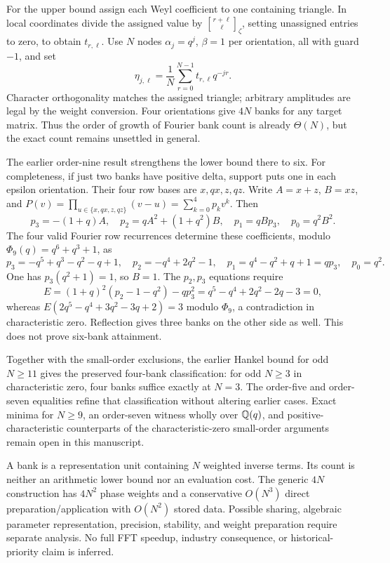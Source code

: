 \documentclass[11pt,letterpaper]{article}
\theoremstyle{definition}\newtheorem{definition}[theorem]{Definition}
\newcommand{\gb}[3]{\genfrac{[}{]}{0pt}{}{#1}{#2}_{#3}}
\begin{document}
For the upper bound assign each Weyl coefficient to one containing triangle. In local coordinates divide the assigned value by $\gb{r+\ell}{\ell}\zeta$, setting unassigned entries to zero, to obtain $t_{r,\ell}$. Use $N$ nodes $\alpha_j=q^j$, $\beta=1$ per orientation, all with guard $-1$, and set
\[
 \eta_{j,\ell}=\frac1N\sum_{r=0}^{N-1}t_{r,\ell}q^{-jr}.
\]
Character orthogonality matches the assigned triangle; arbitrary amplitudes are legal by the weight conversion. Four orientations give $4N$ banks for any target matrix. Thus the order of growth of Fourier bank count is already $\Theta(N)$, but the exact count remains unsettled in general.

The earlier order-nine result strengthens the lower bound there to six. For completeness, if just two banks have positive delta, support puts one in each epsilon orientation. Their four row bases are $x,qx,z,qz$. Write $A=x+z$, $B=xz$, and $P(v)=\prod_{u\in\{x,qx,z,qz\}}(v-u)=\sum_{k=0}^4p_kv^k$. Then
\[
 p_3=-(1+q)A,\quad p_2=qA^2+(1+q^2)B,
 \quad p_1=qBp_3,\quad p_0=q^2B^2.
\]
The four valid Fourier row recurrences determine these coefficients, modulo $\Phi_9(q)=q^6+q^3+1$, as
\[
 p_3=-q^5+q^3-q^2-q+1,\quad p_2=-q^4+2q^2-1,
 \quad p_1=q^4-q^2+q+1=qp_3,\quad p_0=q^2.
\]
One has $p_3(q^2+1)=1$, so $B=1$. The $p_2,p_3$ equations require
\[
 E=(1+q)^2(p_2-1-q^2)-qp_3^2=q^5-q^4+2q^2-2q-3=0,
\]
whereas $E(2q^5-q^4+3q^2-3q+2)=3$ modulo $\Phi_9$, a contradiction in characteristic zero. Reflection gives three banks on the other side as well. This does not prove six-bank attainment.

Together with the small-order exclusions, the earlier Hankel bound for odd $N\geq11$ gives the preserved four-bank classification: for odd $N\geq3$ in characteristic zero, four banks suffice exactly at $N=3$. The order-five and order-seven equalities refine that classification without altering earlier cases. Exact minima for $N\geq9$, an order-seven witness wholly over $\mathbb Q(q)$, and positive-characteristic counterparts of the characteristic-zero small-order arguments remain open in this manuscript.

A bank is a representation unit containing $N$ weighted inverse terms. Its count is neither an arithmetic lower bound nor an evaluation cost. The generic $4N$ construction has $4N^2$ phase weights and a conservative $O(N^3)$ direct preparation/application with $O(N^2)$ stored data. Possible sharing, algebraic parameter representation, precision, stability, and weight preparation require separate analysis. No full FFT speedup, industry consequence, or historical-priority claim is inferred.
\end{document}
